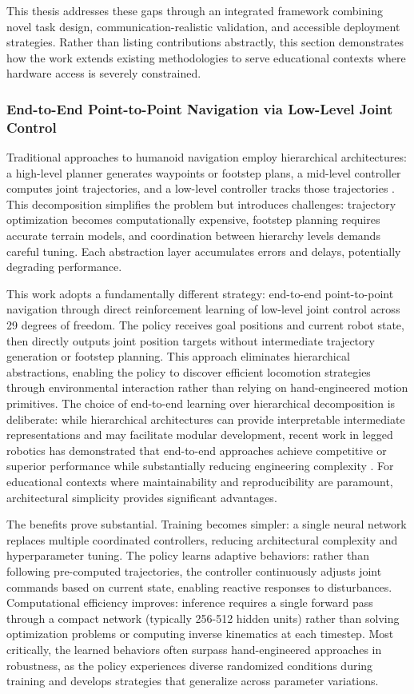 \documentclass[12pt,a4paper]{article}
\begin{document}
This thesis addresses these gaps through an integrated framework combining novel task design, communication-realistic validation, and accessible deployment strategies. Rather than listing contributions abstractly, this section demonstrates how the work extends existing methodologies to serve educational contexts where hardware access is severely constrained.

\subsubsection{End-to-End Point-to-Point Navigation via Low-Level Joint Control}

Traditional approaches to humanoid navigation employ hierarchical architectures: a high-level planner generates waypoints or footstep plans, a mid-level controller computes joint trajectories, and a low-level controller tracks those trajectories \parencite{cheng2024expressive}. This decomposition simplifies the problem but introduces challenges: trajectory optimization becomes computationally expensive, footstep planning requires accurate terrain models, and coordination between hierarchy levels demands careful tuning. Each abstraction layer accumulates errors and delays, potentially degrading performance.

This work adopts a fundamentally different strategy: end-to-end point-to-point navigation through direct reinforcement learning of low-level joint control across 29 degrees of freedom. The policy receives goal positions and current robot state, then directly outputs joint position targets without intermediate trajectory generation or footstep planning. This approach eliminates hierarchical abstractions, enabling the policy to discover efficient locomotion strategies through environmental interaction rather than relying on hand-engineered motion primitives. The choice of end-to-end learning over hierarchical decomposition is deliberate: while hierarchical architectures can provide interpretable intermediate representations and may facilitate modular development, recent work in legged robotics has demonstrated that end-to-end approaches achieve competitive or superior performance while substantially reducing engineering complexity \parencite{gu2024humanoidgym}. For educational contexts where maintainability and reproducibility are paramount, architectural simplicity provides significant advantages.

The benefits prove substantial. Training becomes simpler: a single neural network replaces multiple coordinated controllers, reducing architectural complexity and hyperparameter tuning. The policy learns adaptive behaviors: rather than following pre-computed trajectories, the controller continuously adjusts joint commands based on current state, enabling reactive responses to disturbances. Computational efficiency improves: inference requires a single forward pass through a compact network (typically 256-512 hidden units) rather than solving optimization problems or computing inverse kinematics at each timestep. Most critically, the learned behaviors often surpass hand-engineered approaches in robustness, as the policy experiences diverse randomized conditions during training and develops strategies that generalize across parameter variations.
\end{document}
